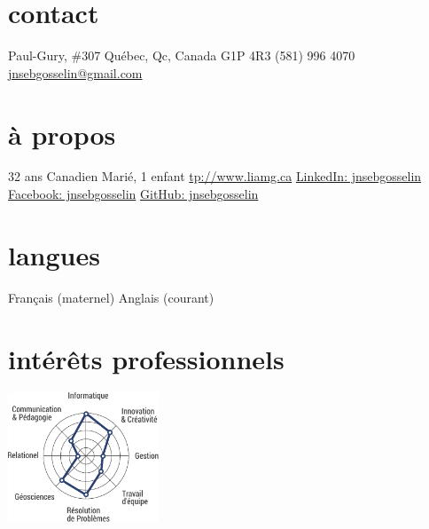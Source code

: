 \documentclass[]{friggeri-cv} %
\def\github{\color{gray}{\FA \faGithubSign}}
\def\facebook{\color{gray}{\FA \faFacebookSign}}
\def\linkedin{\color{gray}{\FA \faLinkedinSign}}
\def\phoneb{\color{gray}{\FA \faPhoneSign}}
\def\home{\color{gray}{\FA \faHome}}
\def\mail{\color{gray}{\FA \faEnvelopeAlt}}
\def\globe{\color{gray}{\FA \faGlobe}}
\begin{document}
%
%
%
\begin{aside} %
	\section{contact}%
	    \vspace{5pt}
		\home{} Paul-Gury, \#307
		\hspace{0.43cm}Québec, Qc, Canada
		\hspace{0.43cm}G1P 4R3\vspace{5pt}
		\phoneb\space (581) 996 4070
		\href{mailto:jnsebgosselin@gmail.com}{\mail\space jnsebgosselin@gmail.com}
		\vspace{10pt}%
	\section{à propos}%
		\vspace{5pt}
		32 ans
		Canadien
		Marié, 1 enfant%
		\vspace{5pt}
		\href{http://www.liamg.ca/qui-sommes-nous/jean-sebastien-gosselin/}{\globe\hspace{0.1cm} tp://www.liamg.ca}
		\href{https://www.linkedin.com/in/jnsebgosselin}{\linkedin\hspace{0.1cm} LinkedIn: jnsebgosselin}
		\href{https://www.facebook.com/jnsebgosselin}{\facebook\hspace{0.1cm} Facebook: jnsebgosselin}
		\href{https://github.com/jnsebgosselin}{\github\hspace{0.1cm} GitHub: jnsebgosselin}
		\vspace{10pt}%
	\section{langues}%
		\vspace{5pt}
		Français (maternel)
		Anglais (courant)
		\vspace{10pt}%
	\section{intérêts professionnels}%
		\vspace{10pt}
		\includegraphics[width=4.5cm]{prof_interests_graph}
		\vspace{5pt}%

\end{aside}
\end{document}
